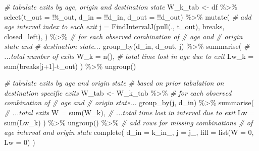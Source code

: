 \documentclass[10pt, twoside]{article}
\newenvironment{Shaded}{}{}
\newcommand{\AttributeTok}[1]{#1}
\newcommand{\CommentTok}[1]{\textit{#1}}
\newcommand{\DecValTok}[1]{#1}
\newcommand{\FunctionTok}[1]{#1}
\newcommand{\NormalTok}[1]{#1}
\newcommand{\OtherTok}[1]{#1}
\newcommand{\SpecialCharTok}[1]{#1}
\begin{document}
\begin{Shaded}
\begin{Highlighting}[]
  \CommentTok{\# tabulate exits by age, origin and destination state}
\NormalTok{  W\_k\_tab }\OtherTok{\textless{}{-}}
\NormalTok{    df }\SpecialCharTok{\%\textgreater{}\%}
    \FunctionTok{select}\NormalTok{(}\AttributeTok{t\_out =} \SpecialCharTok{!!}\NormalTok{t\_out, }\AttributeTok{d\_in =} \SpecialCharTok{!!}\NormalTok{d\_in, }\AttributeTok{d\_out =} \SpecialCharTok{!!}\NormalTok{d\_out) }\SpecialCharTok{\%\textgreater{}\%}
    \FunctionTok{mutate}\NormalTok{(}
      \CommentTok{\# add age interval index to each exit}
      \AttributeTok{j =} \FunctionTok{FindIntervalJ}\NormalTok{(}\FunctionTok{pull}\NormalTok{(., t\_out), breaks, closed\_left),}
\NormalTok{    ) }\SpecialCharTok{\%\textgreater{}\%}
    \CommentTok{\# for each observed combination of}
    \CommentTok{\# age and}
    \CommentTok{\# origin state and}
    \CommentTok{\# destination state...}
    \FunctionTok{group\_by}\NormalTok{(d\_in, d\_out, j) }\SpecialCharTok{\%\textgreater{}\%}
    \FunctionTok{summarise}\NormalTok{(}
      \CommentTok{\# ...total number of exits}
      \AttributeTok{W\_k =} \FunctionTok{n}\NormalTok{(),}
      \CommentTok{\# total time lost in age due to exit}
      \AttributeTok{Lw\_k =} \FunctionTok{sum}\NormalTok{(breaks[j}\SpecialCharTok{+}\DecValTok{1}\NormalTok{]}\SpecialCharTok{{-}}\NormalTok{t\_out)}
\NormalTok{    ) }\SpecialCharTok{\%\textgreater{}\%}
    \FunctionTok{ungroup}\NormalTok{()}

  \CommentTok{\# tabulate exits by age and origin state}
  \CommentTok{\# based on prior tabulation on destination specific exits}
\NormalTok{  W\_tab }\OtherTok{\textless{}{-}}
\NormalTok{    W\_k\_tab }\SpecialCharTok{\%\textgreater{}\%}
    \CommentTok{\# for each observed combination of}
    \CommentTok{\# age and}
    \CommentTok{\# origin state...}
    \FunctionTok{group\_by}\NormalTok{(j, d\_in) }\SpecialCharTok{\%\textgreater{}\%}
    \FunctionTok{summarise}\NormalTok{(}
      \CommentTok{\# ...total exits}
      \AttributeTok{W =} \FunctionTok{sum}\NormalTok{(W\_k),}
      \CommentTok{\# ...total time lost in interval due to exit}
      \AttributeTok{Lw =} \FunctionTok{sum}\NormalTok{(Lw\_k)}
\NormalTok{    ) }\SpecialCharTok{\%\textgreater{}\%}
    \FunctionTok{ungroup}\NormalTok{() }\SpecialCharTok{\%\textgreater{}\%}
    \CommentTok{\# add rows for missing combinations}
    \CommentTok{\# of age interval and origin state}
    \FunctionTok{complete}\NormalTok{(}
      \AttributeTok{d\_in =}\NormalTok{ k\_in\_, }\AttributeTok{j =}\NormalTok{ j\_,}
      \AttributeTok{fill =} \FunctionTok{list}\NormalTok{(}\AttributeTok{W =} \DecValTok{0}\NormalTok{, }\AttributeTok{Lw =} \DecValTok{0}\NormalTok{)}
\NormalTok{    )}


\end{Highlighting}
\end{Shaded}
\end{document}
